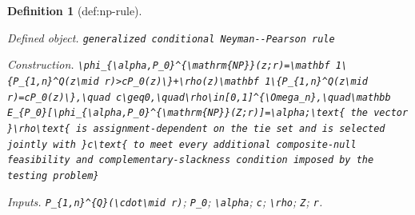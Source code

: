 \documentclass{article}
\newtheorem{definition}{Definition}
\begin{document}
\begin{definition}[def:np-rule]\label{def:np-rule}
\par\smallskip\noindent\emph{Defined object.} \texttt{generalized conditional Neyman-\allowbreak{}-\allowbreak{}Pearson rule}
\par\smallskip\noindent\emph{Construction.} \texttt{\textbackslash{}\allowbreak{}phi\_\allowbreak{}\{\textbackslash{}\allowbreak{}alpha,\allowbreak{}P\_\allowbreak{}0\}\allowbreak{}\textasciicircum{}\{\textbackslash{}\allowbreak{}mathrm\{NP\}\allowbreak{}\}\allowbreak{}(z;\allowbreak{}r)=\allowbreak{}\textbackslash{}\allowbreak{}mathbf 1\textbackslash{}\allowbreak{}\{P\_\allowbreak{}\{1,\allowbreak{}n\}\allowbreak{}\textasciicircum{}Q(z\textbackslash{}\allowbreak{}mid r)>cP\_\allowbreak{}0(z)\textbackslash{}\allowbreak{}\}\allowbreak{}+\allowbreak{}\textbackslash{}\allowbreak{}rho(z)\textbackslash{}\allowbreak{}mathbf 1\textbackslash{}\allowbreak{}\{P\_\allowbreak{}\{1,\allowbreak{}n\}\allowbreak{}\textasciicircum{}Q(z\textbackslash{}\allowbreak{}mid r)=\allowbreak{}cP\_\allowbreak{}0(z)\textbackslash{}\allowbreak{}\}\allowbreak{},\allowbreak{}\textbackslash{}\allowbreak{}quad c\textbackslash{}\allowbreak{}geq0,\allowbreak{}\textbackslash{}\allowbreak{}quad\textbackslash{}\allowbreak{}rho\textbackslash{}\allowbreak{}in[0,\allowbreak{}1]\textasciicircum{}\{\textbackslash{}\allowbreak{}Omega\_\allowbreak{}n\}\allowbreak{},\allowbreak{}\textbackslash{}\allowbreak{}quad\textbackslash{}\allowbreak{}mathbb E\_\allowbreak{}\{P\_\allowbreak{}0\}\allowbreak{}[\textbackslash{}\allowbreak{}phi\_\allowbreak{}\{\textbackslash{}\allowbreak{}alpha,\allowbreak{}P\_\allowbreak{}0\}\allowbreak{}\textasciicircum{}\{\textbackslash{}\allowbreak{}mathrm\{NP\}\allowbreak{}\}\allowbreak{}(Z;\allowbreak{}r)]=\allowbreak{}\textbackslash{}\allowbreak{}alpha;\allowbreak{}\textbackslash{}\allowbreak{}text\{ the vector \}\allowbreak{}\textbackslash{}\allowbreak{}rho\textbackslash{}\allowbreak{}text\{ is assignment-\allowbreak{}dependent on the tie set and is selected jointly with \}\allowbreak{}c\textbackslash{}\allowbreak{}text\{ to meet every additional composite-\allowbreak{}null feasibility and complementary-\allowbreak{}slackness condition imposed by the testing problem\}\allowbreak{}}
\par\smallskip\noindent\emph{Inputs.} \texttt{P\_\allowbreak{}\{1,\allowbreak{}n\}\allowbreak{}\textasciicircum{}\{Q\}\allowbreak{}(\textbackslash{}\allowbreak{}cdot\textbackslash{}\allowbreak{}mid r)}; \texttt{P\_\allowbreak{}0}; \texttt{\textbackslash{}\allowbreak{}alpha}; \texttt{c}; \texttt{\textbackslash{}\allowbreak{}rho}; \texttt{Z}; \texttt{r}.
\end{definition}
\end{document}
